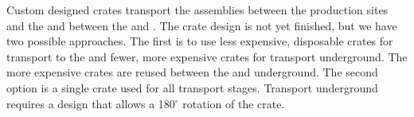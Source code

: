 Custom designed crates transport the assemblies between the production sites and the  and between the  and \surf{}. The crate design is not yet finished, but we have two possible approaches. The first is to use less expensive, disposable crates for transport to the  and fewer, more expensive crates for transport underground. The more expensive crates are reused between the  and underground. The second option is a single crate used for all transport stages. Transport underground requires a design that allows a 180$^{\circ}$ rotation of the crate. 



\begin{comment}
\subsection{APA-to-CPA Assembly and Installation in the Cryostat}
\label{sec:fdsp-apa-install-cryostat}

Once underground, there will be a small storage area for stockpiling \dwords{apa} (see Figure~\ref{fig:handling}). When ready for installation, each \dword{apa} is extracted from its crate, inspected and rotated to be lowered into the area just outside of the \dword{tco} in the cryostat. Two \dwords{apa} are lowered in front of the \dword{tco} where they are linked and cabled. The details of the cabling are still being finalized, but the main option is currently to pass all the cables inside the \dword{apa} frame tubes (see Section~\ref{sec:fdsp-apa-intfc-apa}).




\end{comment}
